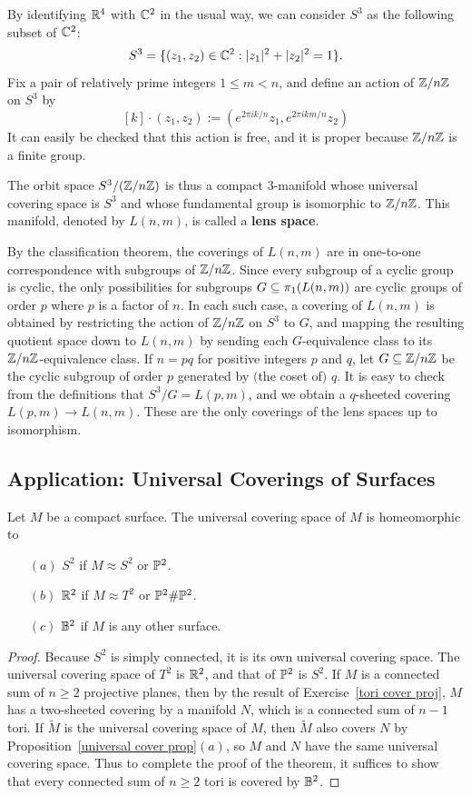 \begin{example}
By identifying $\R^4$ with $\C^2$ in the usual way, we can consider $S^3$ as the following subset of $\C^2$:
\[S^3=\{(z_1,z_2)\in\C^2:|z_1|^2+|z_2|^2=1\}.\]
Fix a pair of relatively prime integers $1\leq m<n$, and define an action of $\Z/n\Z$ on $S^3$ by
\[[k]\cdot(z_1,z_2):=(e^{2\pi ik/n}z_1,e^{2\pi ikm/n}z_2)\]
It can easily be checked that this action is free, and it is proper because $\Z/n\Z$ is a finite group.\par
The orbit space $S^3/(\Z/n\Z)$ is thus a compact $3$-manifold whose universal covering space is $S^3$ and whose fundamental group is isomorphic to $\Z/n\Z$. This manifold, denoted by $L(n,m)$, is called a \textbf{lens space}.\par
By the classification theorem, the coverings of $L(n,m)$ are in one-to-one correspondence with subgroups of $\Z/n\Z$. Since every subgroup of a cyclic group is
cyclic, the only possibilities for subgroups $G\sub\pi_1(L(n,m))$ are
cyclic groups of order $p$ where $p$ is a factor of $n$. In each such case, a covering of $L(n,m)$ is obtained by restricting the action of $\Z/n\Z$ on $S^3$ to $G$, and mapping the resulting quotient space down to $L(n,m)$ by sending each $G$-equivalence class to its $\Z/n\Z$-equivalence class. If $n=pq$ for positive integers $p$ and $q$, let $G\sub\Z/n\Z$ be
the cyclic subgroup of order $p$ generated by $($the coset of$)$ $q$. It is easy to check from the definitions that $S^3/G=L(p,m)$, and we obtain a $q$-sheeted covering $L(p,m)\to L(n,m)$. These are the only coverings of the lens spaces up to isomorphism.
\end{example}
\subsection{Application: Universal Coverings of Surfaces}
\begin{theorem}
Let $M$ be a compact surface. The universal covering space of $M$ is homeomorphic to
\begin{itemize}
\item[$(a)$] $S^2$ if $M\approx S^2$ or $\P^2$.
\item[$(b)$] $\R^2$ if $M\approx T^2$ or $\P^2\#\P^2$.
\item[$(c)$] $\B^2$ if $M$ is any other surface.
\end{itemize}
\end{theorem}
\begin{proof}
Because $S^2$ is simply connected, it is its own universal covering space. The universal covering space of $T^2$ is $\R^2$, and that
of $\P^2$ is $S^2$. If $M$ is a connected sum of $n\geq2$ projective planes, then by the result of Exercise~\ref{tori cover proj}, $M$ has a two-sheeted covering by a manifold $N$, which is a connected sum of $n-1$ tori. If $\widetilde{M}$ is the universal covering space of $M$, then $\widetilde{M}$ also covers $N$ by Proposition~\ref{universal cover prop}$(a)$, so $M$ and $N$ have the same universal covering space. Thus to complete the proof of the theorem, it suffices to show that every connected sum of $n\geq 2$ tori is covered by $\B^2$.
\end{proof}
